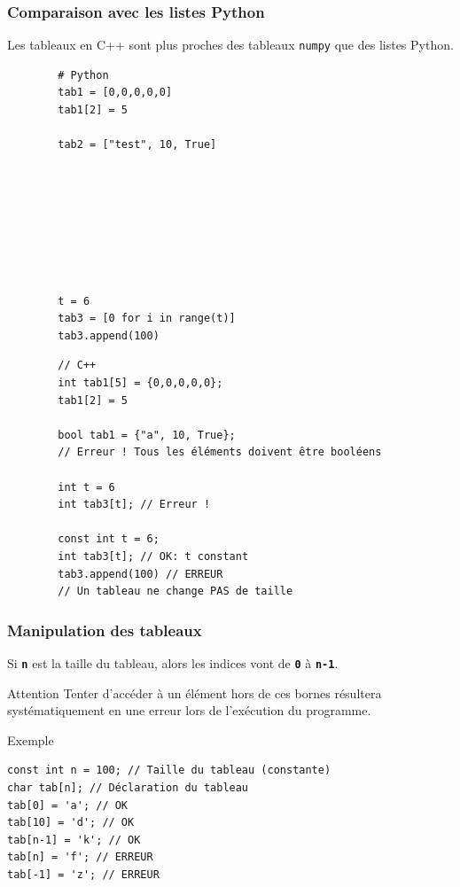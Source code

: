 \begin{frame}[fragile]
 	\frametitle{Comparaison avec les listes Python}
    Les tableaux en C++ sont plus proches des tableaux \texttt{numpy} que des listes Python.
    
	\begin{minipage}{0.49\linewidth}
		\begin{verbatim}
        # Python
        tab1 = [0,0,0,0,0]
        tab1[2] = 5

        tab2 = ["test", 10, True]








        t = 6
        tab3 = [0 for i in range(t)]
        tab3.append(100)
		\end{verbatim}
 	\end{minipage}
 	\begin{minipage}{0.50\linewidth}
 		\begin{verbatim}
        // C++
        int tab1[5] = {0,0,0,0,0};
        tab1[2] = 5

        bool tab1 = {"a", 10, True};
        // Erreur ! Tous les éléments doivent être booléens

        int t = 6
        int tab3[t]; // Erreur !

        const int t = 6;
        int tab3[t]; // OK: t constant
        tab3.append(100) // ERREUR
        // Un tableau ne change PAS de taille
 		\end{verbatim}
 	\end{minipage}
\end{frame}

\begin{frame}[fragile]
	\frametitle{Manipulation des tableaux}
	Si \texttt{\textbf{n}} est la taille du tableau, alors les indices vont de \texttt{\textbf{0}} à \texttt{\textbf{n-1}}.
    
    \begin{alertblock}{Attention}
    Tenter d'accéder à un élément hors de ces bornes résultera systématiquement en une erreur lors de l'exécution du programme.
    \end{alertblock}
	
    \begin{exampleblock}{Exemple}
	\begin{verbatim}
const int n = 100; // Taille du tableau (constante)
char tab[n]; // Déclaration du tableau
tab[0] = 'a'; // OK
tab[10] = 'd'; // OK
tab[n-1] = 'k'; // OK
tab[n] = 'f'; // ERREUR
tab[-1] = 'z'; // ERREUR
	\end{verbatim}
    \end{exampleblock}
\end{frame}
	
